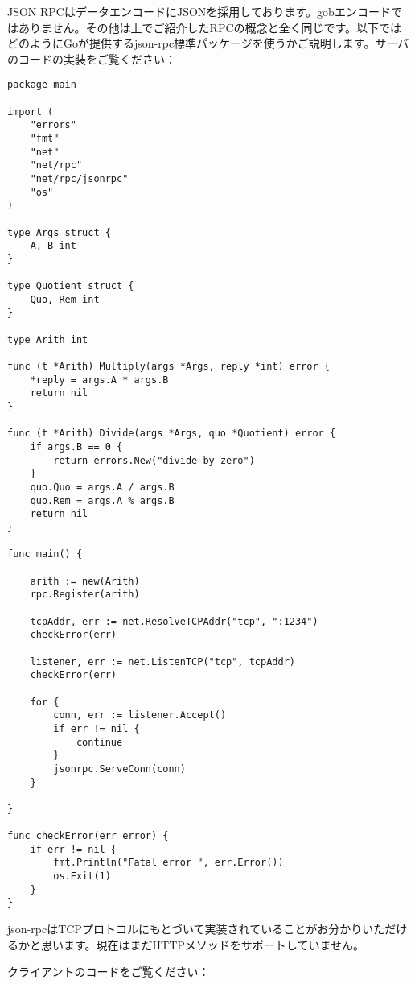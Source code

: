 JSON RPCはデータエンコードにJSONを採用しております。gobエンコードではありません。その他は上でご紹介したRPCの概念と全く同じです。以下ではどのようにGoが提供するjson-rpc標準パッケージを使うかご説明します。サーバのコードの実装をご覧ください：

\begin{lstlisting}[numbers=none]
package main

import (
    "errors"
    "fmt"
    "net"
    "net/rpc"
    "net/rpc/jsonrpc"
    "os"
)

type Args struct {
    A, B int
}

type Quotient struct {
    Quo, Rem int
}

type Arith int

func (t *Arith) Multiply(args *Args, reply *int) error {
    *reply = args.A * args.B
    return nil
}

func (t *Arith) Divide(args *Args, quo *Quotient) error {
    if args.B == 0 {
        return errors.New("divide by zero")
    }
    quo.Quo = args.A / args.B
    quo.Rem = args.A % args.B
    return nil
}

func main() {

    arith := new(Arith)
    rpc.Register(arith)

    tcpAddr, err := net.ResolveTCPAddr("tcp", ":1234")
    checkError(err)

    listener, err := net.ListenTCP("tcp", tcpAddr)
    checkError(err)

    for {
        conn, err := listener.Accept()
        if err != nil {
            continue
        }
        jsonrpc.ServeConn(conn)
    }

}

func checkError(err error) {
    if err != nil {
        fmt.Println("Fatal error ", err.Error())
        os.Exit(1)
    }
}
\end{lstlisting}

json-rpcはTCPプロトコルにもとづいて実装されていることがお分かりいただけるかと思います。現在はまだHTTPメソッドをサポートしていません。

クライアントのコードをご覧ください：

